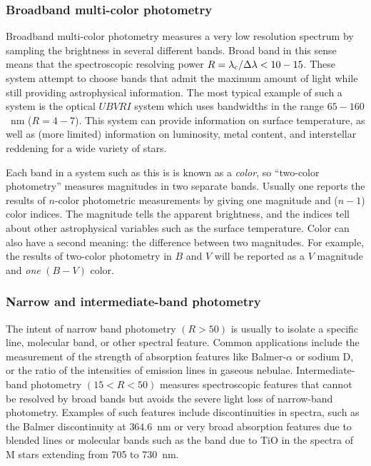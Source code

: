 \subsubsection{Broadband multi-color photometry}
Broadband multi-color
photometry measures a very low resolution spectrum by sampling the
brightness in several different bands. Broad band in this sense means
that the spectroscopic resolving power $R={\lambda_{\rm c}/\Delta
\lambda} < 10-15$. These system attempt to choose bands that admit the
maximum amount of light while still providing astrophysical
information. The most typical example of such a system is the optical $UBVRI$
system which uses bandwidths in the range $65-160$~nm ($R=4-7$). This
system can provide information on surface temperature, as well as
(more limited) information on luminosity, metal content, and
interstellar reddening for a wide variety of stars. 

Each band in a system such as this is is known as a {\it color}, so
``two-color photometry'' measures magnitudes in two separate
bands. Usually one reports the results of $n$-color photometric
measurements by giving one magnitude and ($n-1$) color indices. The
magnitude tells the apparent brightness, and the indices tell about
other astrophysical variables such as the surface temperature. Color
can also have a second meaning: the difference between two
magnitudes. For example, the results of two-color photometry in $B$ and
$V$ will be reported as a $V$ magnitude and {\it one} $(B-V)$ color.

\subsubsection{Narrow and intermediate-band photometry}
The intent of
narrow band photometry $(R>50)$ is usually to isolate a specific line,
molecular band, or other spectral feature. Common applications include
the measurement of the strength of absorption features like
Balmer-$\alpha$ or sodium D, or the ratio of the intensities of
emission lines in gaseous nebulae. Intermediate-band photometry
$(15<R<50)$ measures spectroscopic features that cannot be resolved by
broad bands but avoids the severe light loss of narrow-band
photometry. Examples of such features include discontinuities in
spectra, such as the Balmer discontinuity at $364.6$~nm or very broad
absorption features due to blended lines or molecular bands such as
the band due to TiO in the spectra of M stars extending from 705 to
730~nm.

